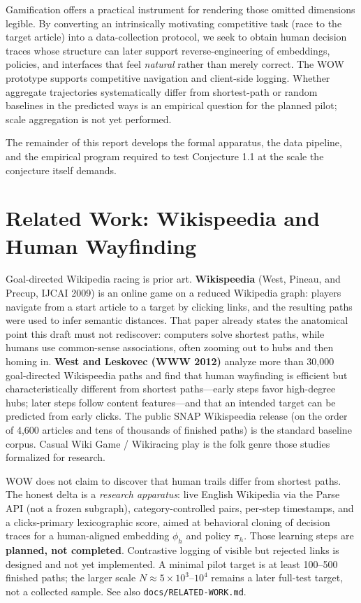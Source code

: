 \documentclass[11pt,a4paper]{report}
\begin{document}
Gamification offers a practical instrument for rendering those omitted dimensions legible. By converting an intrinsically motivating competitive task (race to the target article) into a data-collection protocol, we seek to obtain human decision traces whose structure can later support reverse-engineering of embeddings, policies, and interfaces that feel \textit{natural} rather than merely correct. The WOW prototype supports competitive navigation and client-side logging. Whether aggregate trajectories systematically differ from shortest-path or random baselines in the predicted ways is an empirical question for the planned pilot; scale aggregation is not yet performed.

The remainder of this report develops the formal apparatus, the data pipeline, and the empirical program required to test Conjecture 1.1 at the scale the conjecture itself demands.

\section{Related Work: Wikispeedia and Human Wayfinding}
\label{sec:related-work}

Goal-directed Wikipedia racing is prior art. \textbf{Wikispeedia} (West, Pineau, and Precup, IJCAI 2009) is an online game on a reduced Wikipedia graph: players navigate from a start article to a target by clicking links, and the resulting paths were used to infer semantic distances. That paper already states the anatomical point this draft must not rediscover: computers solve shortest paths, while humans use common-sense associations, often zooming out to hubs and then homing in. \textbf{West and Leskovec (WWW 2012)} analyze more than 30{,}000 goal-directed Wikispeedia paths and find that human wayfinding is efficient but characteristically different from shortest paths---early steps favor high-degree hubs; later steps follow content features---and that an intended target can be predicted from early clicks. The public SNAP Wikispeedia release (on the order of 4{,}600 articles and tens of thousands of finished paths) is the standard baseline corpus. Casual Wiki Game / Wikiracing play is the folk genre those studies formalized for research.

WOW does not claim to discover that human trails differ from shortest paths. The honest delta is a \textit{research apparatus}: live English Wikipedia via the Parse API (not a frozen subgraph), category-controlled pairs, per-step timestamps, and a clicks-primary lexicographic score, aimed at behavioral cloning of decision traces for a human-aligned embedding \(\phi_h\) and policy \(\pi_h\). Those learning steps are \textbf{planned, not completed}. Contrastive logging of visible but rejected links is designed and not yet implemented. A minimal pilot target is at least 100--500 finished paths; the larger scale \(N \approx 5\times 10^{3}\)--\(10^{4}\) remains a later full-test target, not a collected sample. See also \texttt{docs/RELATED-WORK.md}.
\end{document}
